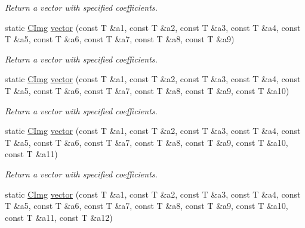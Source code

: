\begin{DoxyCompactItemize}
\begin{DoxyCompactList}\small\item\em Return a vector with specified coefficients. \item\end{DoxyCompactList}\item 
\hypertarget{structcimg__library_1_1_c_img_a3d37c0ed6dcc064819649a7ecc20580c}{
static \hyperlink{structcimg__library_1_1_c_img}{CImg} \hyperlink{structcimg__library_1_1_c_img_a3d37c0ed6dcc064819649a7ecc20580c}{vector} (const T \&a1, const T \&a2, const T \&a3, const T \&a4, const T \&a5, const T \&a6, const T \&a7, const T \&a8, const T \&a9)}
\label{structcimg__library_1_1_c_img_a3d37c0ed6dcc064819649a7ecc20580c}

\begin{DoxyCompactList}\small\item\em Return a vector with specified coefficients. \item\end{DoxyCompactList}\item 
\hypertarget{structcimg__library_1_1_c_img_ad5e0082774349dec6f8037d84af2efa2}{
static \hyperlink{structcimg__library_1_1_c_img}{CImg} \hyperlink{structcimg__library_1_1_c_img_ad5e0082774349dec6f8037d84af2efa2}{vector} (const T \&a1, const T \&a2, const T \&a3, const T \&a4, const T \&a5, const T \&a6, const T \&a7, const T \&a8, const T \&a9, const T \&a10)}
\label{structcimg__library_1_1_c_img_ad5e0082774349dec6f8037d84af2efa2}

\begin{DoxyCompactList}\small\item\em Return a vector with specified coefficients. \item\end{DoxyCompactList}\item 
\hypertarget{structcimg__library_1_1_c_img_a4d20872973c22e19d7d848c2356cd539}{
static \hyperlink{structcimg__library_1_1_c_img}{CImg} \hyperlink{structcimg__library_1_1_c_img_a4d20872973c22e19d7d848c2356cd539}{vector} (const T \&a1, const T \&a2, const T \&a3, const T \&a4, const T \&a5, const T \&a6, const T \&a7, const T \&a8, const T \&a9, const T \&a10, const T \&a11)}
\label{structcimg__library_1_1_c_img_a4d20872973c22e19d7d848c2356cd539}

\begin{DoxyCompactList}\small\item\em Return a vector with specified coefficients. \item\end{DoxyCompactList}\item 
\hypertarget{structcimg__library_1_1_c_img_a04a41a2924b959970d95456aae030bac}{
static \hyperlink{structcimg__library_1_1_c_img}{CImg} \hyperlink{structcimg__library_1_1_c_img_a04a41a2924b959970d95456aae030bac}{vector} (const T \&a1, const T \&a2, const T \&a3, const T \&a4, const T \&a5, const T \&a6, const T \&a7, const T \&a8, const T \&a9, const T \&a10, const T \&a11, const T \&a12)}
\label{structcimg__library_1_1_c_img_a04a41a2924b959970d95456aae030bac}


\end{DoxyCompactItemize}
